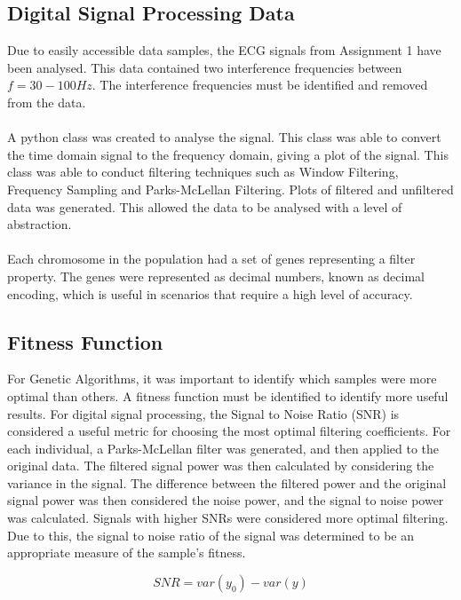 \documentclass[a4paper, 11pt]{article}
\begin{document}
    \subsection{Digital Signal Processing Data}\label{sec:meth_sub1}
        Due to easily accessible data samples, the ECG signals from Assignment 1 have been analysed. This data contained
        two interference frequencies between  $f = 30 - 100Hz$. The interference frequencies must be identified and 
        removed from the data.
        \\\\
        A python class was created to analyse the signal. This class was able to convert the time domain signal to the
        frequency domain, giving a plot of the signal. This class was able to conduct filtering techniques such as Window
        Filtering, Frequency Sampling and Parks-McLellan Filtering. Plots of filtered and unfiltered data was generated. 
        This allowed the data to be analysed with a level of abstraction. 
        \\\\
        Each chromosome in the population had a set of genes representing a filter property. The genes were represented
        as decimal numbers, known as decimal encoding, which is useful in scenarios that require a high level of accuracy. 

    \subsection{Fitness Function}\label{sec:meth_sub2}
        For Genetic Algorithms, it was important to identify which samples were more optimal than others. A fitness
        function must be identified to identify more useful results. For digital signal processing, the Signal to Noise
        Ratio (SNR) is considered a useful metric for choosing the most optimal filtering coefficients. For each 
        individual, a Parks-McLellan filter was generated, and then applied to the original data. The filtered signal
        power was then calculated by considering the variance in the signal. The difference between the filtered power
        and the original signal power was then considered the noise power, and the signal to noise power was calculated. 
        Signals with higher SNRs were considered more optimal filtering. Due to this, the signal to noise ratio of the 
        signal was determined to be an appropriate measure of the sample's fitness. 

        \begin{equation} SNR = var(y_{0}) - var(y)\end{equation}
\end{document}
